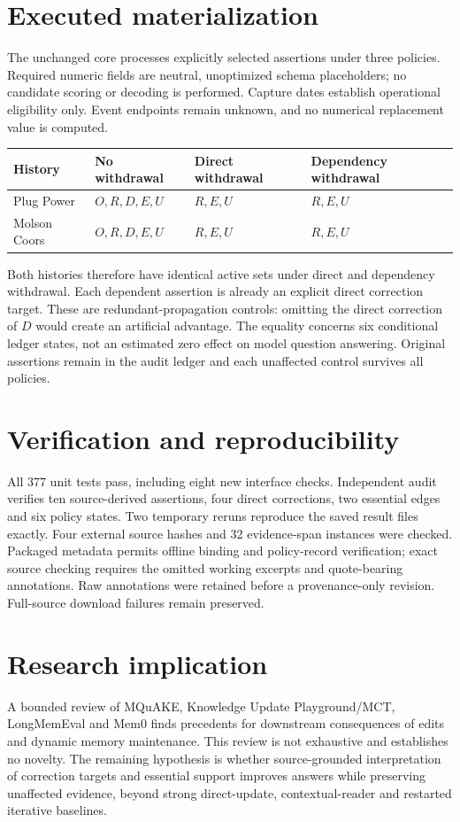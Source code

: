 \documentclass[11pt]{article}
\begin{document}
\section{Executed materialization}\label{sec:v10replay}
The unchanged core processes explicitly selected assertions under three policies. Required numeric fields are neutral, unoptimized schema placeholders; no candidate scoring or decoding is performed. Capture dates establish operational eligibility only. Event endpoints remain unknown, and no numerical replacement value is computed.

\begin{center}
\begin{tabular}{llll}
\toprule
History & No withdrawal & Direct withdrawal & Dependency withdrawal\\
\midrule
Plug Power & $O,R,D,E,U$ & $R,E,U$ & $R,E,U$\\
Molson Coors & $O,R,D,E,U$ & $R,E,U$ & $R,E,U$\\
\bottomrule
\end{tabular}
\end{center}

Both histories therefore have identical active sets under direct and dependency withdrawal. Each dependent assertion is already an explicit direct correction target. These are redundant-propagation controls: omitting the direct correction of $D$ would create an artificial advantage. The equality concerns six conditional ledger states, not an estimated zero effect on model question answering. Original assertions remain in the audit ledger and each unaffected control survives all policies.

\section{Verification and reproducibility}\label{sec:v10verification}
All 377 unit tests pass, including eight new interface checks. Independent audit verifies ten source-derived assertions, four direct corrections, two essential edges and six policy states. Two temporary reruns reproduce the saved result files exactly. Four external source hashes and 32 evidence-span instances were checked. Packaged metadata permits offline binding and policy-record verification; exact source checking requires the omitted working excerpts and quote-bearing annotations. Raw annotations were retained before a provenance-only revision. Full-source download failures remain preserved.

\section{Research implication}\label{sec:v10route}
A bounded review of MQuAKE, Knowledge Update Playground/MCT, LongMemEval and Mem0 finds precedents for downstream consequences of edits and dynamic memory maintenance. This review is not exhaustive and establishes no novelty. The remaining hypothesis is whether source-grounded interpretation of correction targets and essential support improves answers while preserving unaffected evidence, beyond strong direct-update, contextual-reader and restarted iterative baselines.
\end{document}
